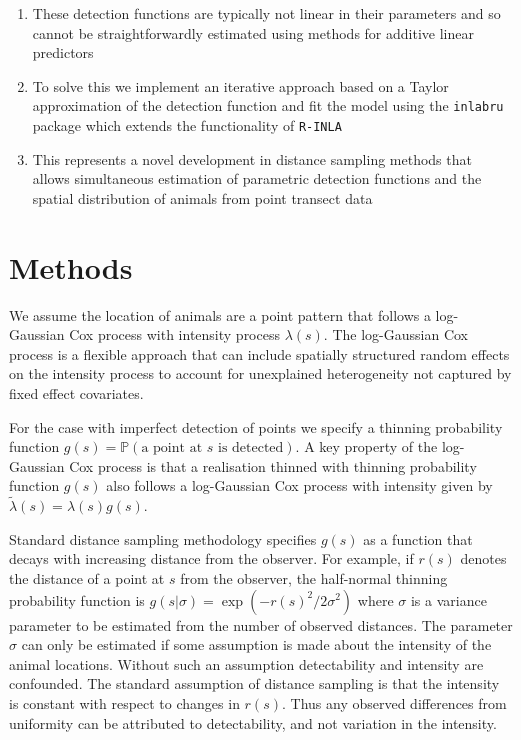 \documentclass[preprint,12pt]{elsarticle}
\newcommand{\tl}{\tilde{\lambda}}   %
\begin{document}
\begin{enumerate}
	\item  These detection functions are typically not linear in their parameters and so cannot be straightforwardly estimated using methods for additive linear predictors
	\item To solve this we implement an iterative approach based on a Taylor approximation of the detection function and fit the model using the \texttt{inlabru} package which extends the functionality of \texttt{R-INLA}
	\item This represents a novel development in distance sampling methods that allows simultaneous estimation of parametric detection functions and the spatial distribution of animals from point transect data
\end{enumerate}

\section*{Methods}

We assume the location of animals are a point pattern that follows a log-Gaussian Cox process with intensity process $\lambda(s)$.  The log-Gaussian Cox process is a flexible approach that can include spatially structured random effects on the intensity process to account for unexplained heterogeneity not captured by fixed effect covariates.  

\sloppy For the case with imperfect detection of points we specify a thinning probability function $g(s) = \mathbb{P}(\text{a point at $s$ is detected})$. A key property of the log-Gaussian Cox process is that a realisation thinned with thinning probability function $g(s)$ also follows a log-Gaussian Cox process with intensity given by $\tl(s) = \lambda(s)g(s)$.  

Standard distance sampling methodology specifies $g(s)$ as a function that decays with increasing distance from the observer.  For example, if $r(s)$ denotes the distance of a point at $s$ from the observer, the half-normal thinning probability function is $g(s | \sigma) = \exp(-r(s)^2 / 2\sigma^2)$ where $\sigma$ is a variance parameter to be estimated from the number of observed distances.  The parameter $\sigma$ can only be estimated if some assumption is made about the intensity of the animal locations.  Without such an assumption detectability and intensity are confounded.  The standard assumption of distance sampling is that the intensity is constant with respect to changes in $r(s)$.  Thus any observed differences from uniformity can be attributed to detectability, and not variation in the intensity.  
\end{document}
